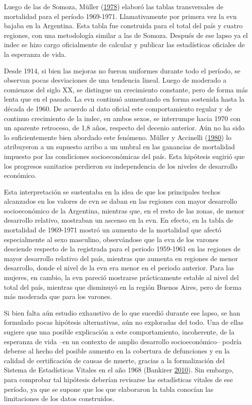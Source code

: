 \documentclass[12pt,spanish,]{article}
\begin{document}
Luego de las de Somoza, Müller
(\protect\hyperlink{ref-Mueller1978}{1978}) elaboró las tablas
transversales de mortalidad para el período 1969-1971. Llamativamente
por primera vez la \gls{evn} bajaba en la Argentina. Esta tabla fue
construida para el total del país y cuatro regiones, con una metodología
similar a las de Somoza. Después de ese lapso ya el \gls{indec} se hizo
cargo oficialmente de calcular y publicar las estadísticas oficiales de
la esperanza de vida.

Desde 1914, si bien las mejoras no fueron uniformes durante todo el
período, se observan pocas desviaciones de una tendencia lineal. Luego
de moderado a comienzos del siglo XX, se distingue un crecimiento
constante, pero de forma más lenta que en el pasado. La \gls{evn}
continuó aumentando en forma sostenida hasta la década de 1960. De
acuerdo al dato oficial este comportamiento regular y de continuo
crecimiento de la \gls{indec}, en ambos sexos, se interrumpe hacia 1970
con un aparente retroceso, de 1,8 años, respecto del decenio anterior.
Aún no ha sido lo suficientemente bien abordado este fenómeno. Müller y
Accinelli (\protect\hyperlink{ref-MuellerAccinelli1980}{1980}) lo
atribuyeron a un supuesto arribo a un umbral en las ganancias de
mortalidad impuesto por las condiciones socioeconómicas del país. Esta
hipótesis sugirió que los progresos sanitarios perdieron su
independencia de los niveles de desarrollo económico.

Esta interpretación se sustentaba en la idea de que los principales
techos alcanzados en los valores de \gls{evn} se daban en las regiones
con mayor desarrollo socioeconómico de la Argentina, mientras que, en el
resto de las zonas, de menor desarrollo relativo, mostraban un ascenso
en la \gls{evn}. En efecto, en la tabla de mortalidad de 1969-1971
mostró un aumento de la mortalidad que afectó especialmente al sexo
masculino, observándose que la \gls{evn} de los varones desciende
respecto de la registrada para el periodo 1959-1961 en las regiones de
mayor desarrollo relativo del país, mientras que aumenta en regiones de
menor desarrollo, donde el nivel de la \gls{evn} era menor en el periodo
anterior. Para las mujeres, en cambio, la \gls{evn} pareció mostrarse
prácticamente estable al nivel del total del país, mientras que
disminuyó en la región Buenos Aires, pero de forma más moderada que para
los varones.

Si bien falta aún estudio exhaustivo de lo que sucedió durante ese
lapso, se han formulado pocas hipótesis alternativas, aún no exploradas
del todo. Una de ellas sugiere que una posible explicación a este
comportamiento, incoherente, de la esperanza de vida --en un contexto de
amplio desarrollo socioeconómico-- podría deberse al hecho del posible
aumento en la cobertura de defunciones y en la calidad de certificación
de causas de muerte, gracias a la formalización del Sistema de
Estadísticas Vitales en el año 1968 (Bankirer
\protect\hyperlink{ref-Bankirer2010}{2010}). Sin embargo, para comprobar
tal hipótesis deberían revisarse las estadísticas vitales de ese
período, ya que se supone que los que elaboraron la tabla conocían las
limitaciones de los datos construidos.
\end{document}
